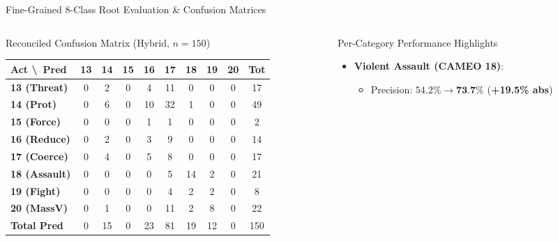 \documentclass[aspectratio=169, 10pt]{beamer}
\begin{document}
\begin{frame}{Fine-Grained 8-Class Root Evaluation \& Confusion Matrices}
  \begin{columns}[T]
    \begin{column}{0.48\textwidth}
      \begin{block}{Reconciled Confusion Matrix (Hybrid, $n=150$)}
        \centering
        \scriptsize
        \setlength{\tabcolsep}{2.2pt}
        \begin{tabular}{lcccccccc|c}
          \toprule
          \textbf{Act \textbackslash\ Pred} & \textbf{13} & \textbf{14} & \textbf{15} & \textbf{16} & \textbf{17} & \textbf{18} & \textbf{19} & \textbf{20} & \textbf{Tot} \\
          \midrule
          \textbf{13 (Threat)}  & 0 & 2 & 0 & 4 & 11 & 0 & 0 & 0 & 17 \\
          \textbf{14 (Prot)}    & 0 & 6 & 0 & 10 & 32 & 1 & 0 & 0 & 49 \\
          \textbf{15 (Force)}   & 0 & 0 & 0 & 1 & 1 & 0 & 0 & 0 & 2 \\
          \textbf{16 (Reduce)}  & 0 & 2 & 0 & 3 & 9 & 0 & 0 & 0 & 14 \\
          \textbf{17 (Coerce)}  & 0 & 4 & 0 & 5 & 8 & 0 & 0 & 0 & 17 \\
          \textbf{18 (Assault)} & 0 & 0 & 0 & 0 & 5 & 14 & 2 & 0 & 21 \\
          \textbf{19 (Fight)}   & 0 & 0 & 0 & 0 & 4 & 2 & 2 & 0 & 8 \\
          \textbf{20 (MassV)}   & 0 & 1 & 0 & 0 & 11 & 2 & 8 & 0 & 22 \\
          \midrule
          \textbf{Total Pred}   & 0 & 15 & 0 & 23 & 81 & 19 & 12 & 0 & 150 \\
          \bottomrule
        \end{tabular}
      \end{block}
    \end{column}
    \begin{column}{0.48\textwidth}
      \begin{block}{Per-Category Performance Highlights}
        \small
        \begin{itemize}
          \item \textbf{Violent Assault (CAMEO 18)}:
            \begin{itemize}
              \item Precision: $54.2\% \to \textbf{73.7\%}$ (\textbf{+19.5\% abs})

\end{itemize}
\end{itemize}
\end{block}
\end{column}
\end{columns}
\end{frame}
\end{document}

